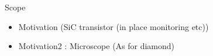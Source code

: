 \begin{frame}{Scope}
	\begin{itemize}
        \pause
        \item Motivation (SiC transistor (in place monitoring etc))
        \item Motivation2 : Microscope (As for diamond)
	\end{itemize}
\end{frame}
